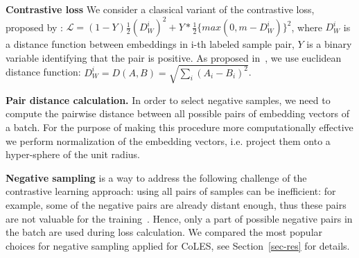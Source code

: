\documentclass[sigconf, anonymous]{acmart}
\begin{document}




\textbf{Contrastive loss} We consider a classical variant of the contrastive loss, proposed by \citep{Hadsell2006DimensionalityRB}: %
$ \mathcal{L} =  (1-Y)\frac{1}{2}(D_W^i)^2 +Y*\frac{1}{2}\{max(0,m-D_W^i)\}^2 $, where $D_W^i$ is a distance function between embeddings in i-th labeled sample pair, $Y$ is a binary variable identifying that the pair is positive.
As proposed in~\citep{Hadsell2006DimensionalityRB}, we use euclidean distance function: $D_W^i = D(A,B) = \sqrt{\sum_i(A_i - B_i)^2}$.

\textbf{Pair distance calculation.} In order to select negative samples, we need to compute the pairwise distance between all possible pairs of embedding vectors of a batch. For the purpose of making this procedure more computationally effective we perform normalization of the embedding vectors, i.e. project them onto a hyper-sphere of the unit radius.


\textbf{Negative sampling} is a way to address the following challenge of the contrastive learning approach: using all pairs of samples can be inefficient: for example, some of the negative pairs are already distant enough, thus these pairs are not valuable for the training~\citep{SimoSerra2015DiscriminativeLO, Schroff2015FaceNetAU}. Hence, only a part of possible negative pairs in the batch are used during loss calculation. We compared the most popular choices for negative sampling applied for CoLES, see Section~\ref{sec-res} for details.
\end{document}
